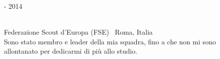 \bigskip

\begin{minipage}{.3\textwidth}
	 - 2014 \faCalendar
\end{minipage}
\hfill
\begin{minipage}{.64\textwidth}
	\vfill
	 \\
	\color{Maroon} Federazione Scout d'Europa (FSE) \color{Sepia} \hfill \faMapMarker \ Roma, Italia
	\smallskip
	\\
	\color{gray} Sono stato membro e leader della mia squadra, fino a che non mi sono allontanato per dedicarmi di più allo studio.
	\vfill
\end{minipage}